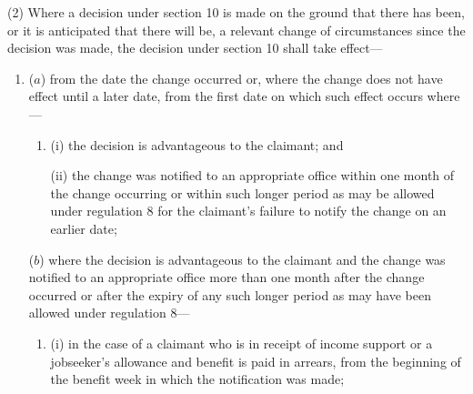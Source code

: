 \documentclass[12pt,a4paper]{article}
\begin{document}
(2) Where a decision under section 10 is made on the ground that there has been, or it is anticipated that there will be, a relevant change of circumstances since the decision was made, the decision under section 10 shall take effect—
\begin{enumerate}\item[]
%

($a$) from the date the change occurred or, where the change does not have effect until a later date, from the first date on which such effect occurs where---
\begin{enumerate}\item[]
(i) the decision is advantageous to the claimant; and

(ii) the change was notified to an appropriate office within one month of the change occurring or within such longer period as may be allowed under regulation 8 for the claimant’s failure to notify the change on an earlier date;
\end{enumerate}

($b$) where the decision is advantageous to the claimant and the change was notified to an appropriate office more than one month after the change occurred or after the expiry of any such longer period as may have been allowed under regulation 8—
\begin{enumerate}\item[]
(i) in the case of a claimant who is in receipt of income support or a jobseeker’s allowance and benefit is paid in arrears, from the beginning of the benefit week in which the notification was made;


\end{enumerate}
\end{enumerate}
\end{document}

